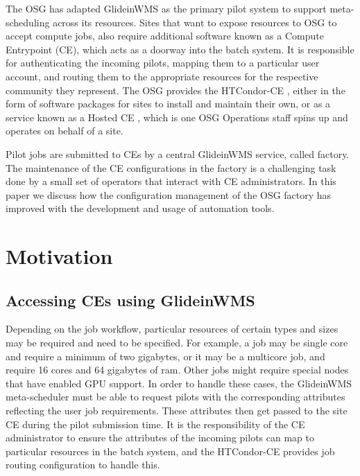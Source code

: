 \documentclass{webofc}
\begin{document}
The OSG has adapted GlideinWMS \cite{GlideinWMSURL} as the primary pilot system to support meta-scheduling across its resources. Sites that want to expose resources to OSG to accept compute jobs, also require additional software known as a Compute Entrypoint (CE), which acts as a doorway into the batch system. It is responsible for authenticating the incoming pilots, mapping them to a particular user account, and routing them to the appropriate resources for the respective community they represent. The OSG provides the HTCondor-CE \cite{}, %
either in the form of software packages for sites to install and maintain their own, or as a service known as a Hosted CE \cite{}, %
which is one OSG Operations staff spins up and operates on behalf of a site.

Pilot jobs are submitted to CEs by a central GlideinWMS service, called  factory. The maintenance of the CE configurations in the factory is a challenging task done by a small set of operators that interact with CE administrators. In this paper we discuss how the configuration management of the OSG factory has improved with the development and usage of automation tools.

\section{Motivation}

\subsection{Accessing CEs using GlideinWMS}


Depending on the job workflow, particular resources of certain types and sizes may be required and need to be specified. For example, a job may be single core and require a minimum of two gigabytes, or it may be a multicore job, and require 16 cores and 64 gigabytes of ram. Other jobs might require special nodes that have enabled GPU support. In order to handle these cases, the GlideinWMS meta-scheduler must be able to request pilots with the corresponding attributes reflecting the user job requirements. These attributes then get passed to the site CE during the pilot submission time. It is the responsibility of the CE administrator to ensure the attributes of the incoming pilots can map to particular resources in the batch system, and the HTCondor-CE provides job routing configuration to handle this.
\end{document}
